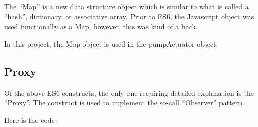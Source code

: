The ``Map'' is a new data structure object which is similar to what is called a 
``hash'', dictionary, or associative array.  Prior to ES6, the Javascript 
object was used functionally as a Map, however, this was kind of a hack.

In this project, the Map object is used in the pumpActuator object.

\subsection{Proxy}

Of the above ES6 constructs, the only one requiring detailed explanation is the 
``Proxy''.  The construct is used to implement the so-call ``Observer'' pattern.

Here is the code:

\begin{verbatim}

\end{verbatim}







